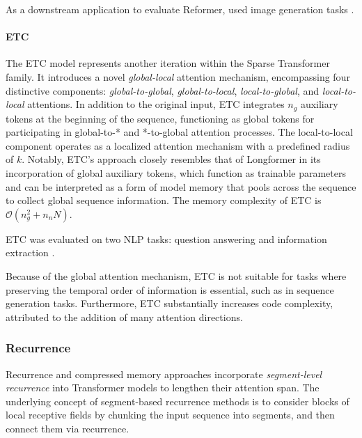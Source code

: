 As a downstream application to evaluate Reformer, \citet{kitaev2020reformer} used image generation tasks \citep{parmar2018image}.

\paragraph{ETC}

The \ac{ETC} model \citep{ainslie2020etc} represents another iteration within the Sparse Transformer family. It introduces a novel \textit{global-local} attention mechanism, encompassing four distinctive components: \textit{global-to-global}, \textit{global-to-local}, \textit{local-to-global}, and \textit{local-to-local} attentions. In addition to the original input, \ac{ETC} integrates $n_g$ auxiliary tokens at the beginning of the sequence, functioning as global tokens for participating in global-to-* and *-to-global attention processes. The local-to-local component operates as a localized attention mechanism with a predefined radius of $k$. Notably, \ac{ETC}'s approach closely resembles that of Longformer in its incorporation of global auxiliary tokens, which function as trainable parameters and can be interpreted as a form of model memory that pools across the sequence to collect global sequence information. The memory complexity of \ac{ETC} is $\mathcal{O}(n_g^2 + n_n N)$. 

\ac{ETC} was evaluated on two \ac{NLP} tasks: question answering \citep{yang2018hotpotqa, welbl2018constructing, kwiatkowski2019natural} and information extraction \citep{xiong2019open}. 

Because of the global attention mechanism, \ac{ETC} is not suitable for tasks where preserving the temporal order of information is essential, such as in sequence generation tasks. Furthermore, \ac{ETC} substantially increases code complexity, attributed to the addition of many attention directions.

\subsubsection{Recurrence}

Recurrence and compressed memory approaches incorporate \textit{segment-level recurrence} into Transformer models to lengthen their attention span. The underlying concept of segment-based recurrence methods is to consider blocks of local receptive fields by chunking the input sequence into segments, and then connect them via recurrence.

